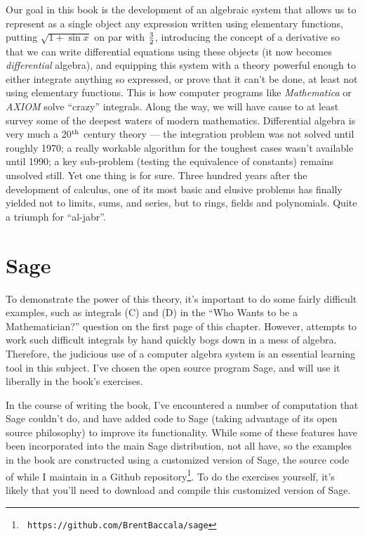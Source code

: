 Our goal in this book is the development of an algebraic system that
allows us to represent as a single object any expression written using
elementary functions, putting $\sqrt{1 + \sin x}$ on par with
$3\over2$, introducing the concept of a derivative so that we can
write differential equations using these objects (it now becomes {\it
differential} algebra), and equipping this system with a theory
powerful enough to either integrate anything so expressed, or prove
that it can't be done, at least not using elementary functions.  This
is how computer programs like {\it Mathematica} or {\it AXIOM} solve
``crazy'' integrals.  Along the way, we will have cause to
at least survey some of the deepest waters of modern
mathematics.  Differential algebra is very much a 20$^{\rm th}$
century theory --- the integration problem was not solved until
roughly 1970; a really workable algorithm for the toughest cases
wasn't available until 1990; a key sub-problem (testing the
equivalence of constants) remains unsolved still.  Yet one thing is
for sure.  Three hundred years after the development of calculus, one
of its most basic and elusive problems has finally yielded not to
limits, sums, and series, but to rings, fields and polynomials.  Quite a
triumph for ``al-jabr''.

\vfill\eject
\section{Sage}

To demonstrate the power of this theory, it's important to do some
fairly difficult examples, such as integrals (C) and (D) in the ``Who
Wants to be a Mathematician?'' question on the first page of this
chapter.  However, attempts to work such difficult integrals by hand
quickly bogs down in a mess of algebra.  Therefore, the judicious use
of a computer algebra system is an essential learning tool in this
subject.  I've chosen the open source program Sage, and will use it
liberally in the book's exercises.

In the course of writing the book, I've encountered a number of
computation that Sage couldn't do, and have added code to Sage (taking
advantage of its open source philosophy) to improve its functionality.
While some of these features have been incorporated into the main Sage
distribution, not all have, so the examples in the book are
constructed using a customized version of Sage, the source code of
while I maintain in a Github repository\footnote{\tt
https://github.com/BrentBaccala/sage}.  To do the exercises yourself,
it's likely that you'll need to download and compile this customized
version of Sage.

